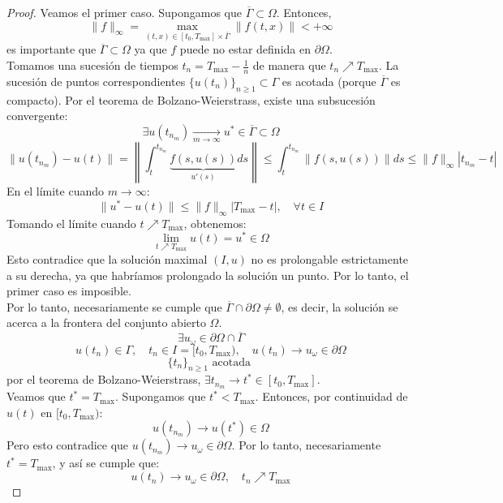 \begin{proof}
    Veamos el primer caso. Supongamos que $\overline{\Gamma} \subset \Omega$. Entonces,
    \[
        \| f \|_\infty = \max_{(t, x) \in [t_0, T_{\text{max}}] \times \overline{\Gamma}} \| f(t, x) \| < +\infty
    \]
    es importante que $\overline{\Gamma} \subset \Omega$ ya que $f$ puede no estar definida en $\partial \Omega$.\\
    Tomamos una sucesión de tiempos $t_n = T_{\text{max}} - \frac{1}{n}$ de manera que $t_n \nearrow T_{\text{max}}$. La sucesión de puntos correspondientes $\{u(t_n)\}_{n \geq 1} \subset \Gamma$ es acotada (porque $\overline{\Gamma}$ es compacto). Por el teorema de Bolzano-Weierstrass, existe una subsucesión convergente:
    \[
        \exists u(t_{n_m}) \xrightarrow[m \to \infty]{} u^* \in \overline{\Gamma} \subset \Omega
    \]
    \[
        \| u(t_{n_m}) - u(t) \| = \left\| \int_t^{t_{n_m}} \underbrace{f(s, u(s))}_{u'(s)} ds \right\| \leq \int_t^{t_{n_m}} \| f(s, u(s)) \| ds \leq \| f \|_\infty | t_{n_m} - t |
    \]
    En el límite cuando $m \to \infty$:
    \[
        \| u^* - u(t) \| \leq \| f \|_\infty | T_{\text{max}} - t |, \quad \forall t \in I
    \]
    Tomando el límite cuando $t \nearrow T_{\text{max}}$, obtenemos:
    \[
        \lim_{t \nearrow T_{\text{max}}} u(t) = u^* \in \Omega
    \]
    Esto contradice que la solución maximal $(I, u)$ no es prolongable estrictamente a su derecha, ya que habríamos prolongado la solución un punto. Por lo tanto, el primer caso es imposible.\\
    Por lo tanto, necesariamente se cumple que $\overline{\Gamma} \cap \partial \Omega \neq \emptyset$, es decir, la solución se acerca a la frontera del conjunto abierto $\Omega$.
    \[
        \exists u_\omega \in \partial \Omega \cap \overline{\Gamma} 
    \]
    \[
        u(t_n) \in \Gamma, \quad t_n \in I = [t_0, T_{\text{max}}), \quad u(t_n) \to u_\omega \in \partial \Omega
    \]
    \[
        \{t_n\}_{n \geq 1} \text{ acotada }
    \]
    por el teorema de Bolzano-Weierstrass, $\exists t_{n_m} \to t^* \in [t_0, T_{\text{max}}]$.\\
    Veamos que $t^* = T_{\text{max}}$. Supongamos que $t^* < T_{\text{max}}$. Entonces, por continuidad de $u(t)$ en $[t_0, T_{\text{max}})$:
    \[
        u(t_{n_m}) \to u(t^*) \in \Omega
    \]
    Pero esto contradice que $u(t_{n_m}) \to u_\omega \in \partial \Omega$. Por lo tanto, necesariamente $t^* = T_{\text{max}}$, y así se cumple que:
    \[
        u(t_n) \to u_\omega \in \partial \Omega, \quad t_n \nearrow T_{\text{max}}
    \]

\end{proof}


